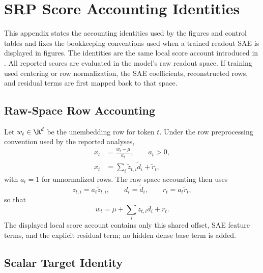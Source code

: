 
\section{SRP Score Accounting Identities}
\label{app:score-accounting}
\label{app:interpreting-sparse-readout-prism-figures}
\label{app:additional-diagnostics}

This appendix states the accounting identities used by the figures and control
tables and fixes the bookkeeping conventions used when a trained readout SAE is
displayed in figures. The identities are the same local score account introduced in
. All reported scores are evaluated in the
model's raw readout space. If training used centering or row normalization, the
SAE coefficients, reconstructed rows, and residual terms are first mapped back
to that space.

\subsection{Raw-Space Row Accounting}
\label{app:score-accounting-row-factorization}

Let \(w_t\in\R^d\) be the unembedding row for token \(t\). Under the row
preprocessing convention used by the reported analyses,
\[
    \begin{aligned}
    x_t&=\frac{w_t-\mu}{a_t}, \qquad a_t>0,\\
    x_t&=\sum_i \widetilde z_{t,i}\widetilde d_i+\widetilde r_t,
    \end{aligned}
\]
with \(a_t=1\) for unnormalized rows. The raw-space accounting then uses
\[
    z_{t,i}=a_t\widetilde z_{t,i},
    \qquad
    d_i=\widetilde d_i,
    \qquad
    r_t=a_t\widetilde r_t,
\]
so that
\[
    w_t=\mu+\sum_i z_{t,i}d_i+r_t .
\]
The displayed local score account contains only this shared offset, SAE feature
terms, and the explicit residual term; no hidden dense base term is added.

\subsection{Scalar Target Identity}
\label{app:score-accounting-linear-query}

